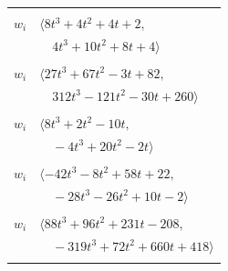 \documentclass[11pt]{article}
\begin{document}
\begin{longtable}{@{}ll@{}}
\addlinespace[2pt]
\multicolumn{2}{@{}p{0.97\textwidth}@{}}{$i=23$, $D_i=1$, $\rho_{ij}$: $6{:}1, \allowbreak 13{:}2, \allowbreak 31{:}1, \allowbreak 32{:}1, \allowbreak 50{:}1, \allowbreak 56{:}1$}\\
$w_i$ & $\langle 8t^{3}+4t^{2}+4t+2,$\\
 & $\quad 4t^{3}+10t^{2}+8t+4\rangle$\\
\addlinespace[2pt]
\multicolumn{2}{@{}p{0.97\textwidth}@{}}{$i=24$, $D_i=16$, $\rho_{ij}$: $22{:}2, \allowbreak 37{:}2, \allowbreak 40{:}2, \allowbreak 54{:}2, \allowbreak 57{:}2, \allowbreak 58{:}2, \allowbreak 61{:}2$}\\
$w_i$ & $\langle 27t^{3}+67t^{2}-3t+82,$\\
 & $\quad 312t^{3}-121t^{2}-30t+260\rangle$\\
\addlinespace[2pt]
\multicolumn{2}{@{}p{0.97\textwidth}@{}}{$i=25$, $D_i=2$, $\rho_{ij}$: $3{:}1, \allowbreak 6{:}2, \allowbreak 9{:}1, \allowbreak 11{:}2, \allowbreak 14{:}2, \allowbreak 22{:}1, \allowbreak 52{:}2$}\\
$w_i$ & $\langle 8t^{3}+2t^{2}-10t,$\\
 & $\quad -4t^{3}+20t^{2}-2t\rangle$\\
\addlinespace[2pt]
\multicolumn{2}{@{}p{0.97\textwidth}@{}}{$i=26$, $D_i=2$, $\rho_{ij}$: $2{:}1, \allowbreak 6{:}1, \allowbreak 10{:}2, \allowbreak 11{:}2, \allowbreak 14{:}1, \allowbreak 16{:}2, \allowbreak 18{:}1, \allowbreak 19{:}1, \allowbreak 22{:}2, \allowbreak 41{:}2, \allowbreak 43{:}1$}\\
$w_i$ & $\langle -42t^{3}-8t^{2}+58t+22,$\\
 & $\quad -28t^{3}-26t^{2}+10t-2\rangle$\\
\addlinespace[2pt]
\multicolumn{2}{@{}p{0.97\textwidth}@{}}{$i=27$, $D_i=32$, $\rho_{ij}$: $0{:}1, \allowbreak 8{:}2, \allowbreak 16{:}1, \allowbreak 21{:}2, \allowbreak 34{:}2, \allowbreak 37{:}1, \allowbreak 43{:}1, \allowbreak 53{:}2, \allowbreak 55{:}2, \allowbreak 56{:}2, \allowbreak 57{:}2$}\\
$w_i$ & $\langle 88t^{3}+96t^{2}+231t-208,$\\
 & $\quad -319t^{3}+72t^{2}+660t+418\rangle$\\
\addlinespace[2pt]
\multicolumn{2}{@{}p{0.97\textwidth}@{}}{$i=28$, $D_i=8$, $\rho_{ij}$: $2{:}2, \allowbreak 8{:}2, \allowbreak 12{:}1, \allowbreak 14{:}2, \allowbreak 22{:}2, \allowbreak 38{:}1, \allowbreak 41{:}1, \allowbreak 48{:}1, \allowbreak 51{:}2, \allowbreak 53{:}1, \allowbreak 56{:}1, \allowbreak 62{:}2$}\\

\end{longtable}
\end{document}
